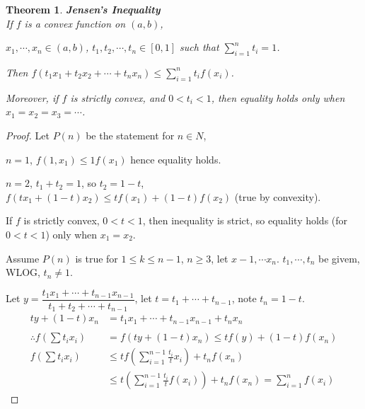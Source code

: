 \documentclass[12pt]{article}
\theoremstyle{plain}
\newtheorem{theorem}{Theorem}[subsection]
\begin{document}
    \begin{theorem}{\textbf{Jensen's Inequality}}\\
			If $f$ is a convex function on $(a,b)$, 
			
			$x_1, \cdots, x_n \in (a,b)$,
			$t_1, t_2, \cdots, t_n \in [0, 1]$ such that $\sum^n_{i=1} t_i = 1$. 

			Then $f(t_1x_1+t_2x_2+\cdots+t_nx_n) \leq \sum^n_{i=1}t_if(x_i)$. 

			Moreover, if $f$ is strictly convex, and $0<t_i<1$, 
			then equality holds only when $x_1 = x_2 = x_3 = \cdots$. 
    \end{theorem} 
    \begin{proof}
    	Let $P(n)$ be the statement for $n\in N$,

    	$n=1$, $f(1, x_1) \leq 1f(x_1)$ hence equality holds. 

    	$n = 2$, $t_1+t_2 = 1$, so $t_2 = 1-t$, 
    	$f(t x_1+(1-t)x_2)\leq tf(x_1)+(1-t)f(x_2)$ (true by convexity). 

    	If $f$ is strictly convex, $0 < t < 1$, then inequality is strict,
    	so equality holds (for $0 < t < 1$) only when $x_1 = x_2$. 

    	Assume $P(n)$ is true for $1\leq k\leq n-1$, $n\geq 3$, 
    	let $x-1, \cdots x_n$. $t_1,\cdots, t_n$ be givem, WLOG, 
    	$t_n\neq 1$. 

    	Let $y = \dfrac{t_1x_1+\cdots+t_{n-1}x_{n-1}}{t_1+t_2+\cdots+t_{n-1}}$,
    	let $t = t_1+\cdots + t_{n-1}$, note $t_n = 1-t$. 
			\begin{align*}
				ty + (1-t) x_n &= t_1x_1+\cdots+t_{n-1}x_{n-1}+t_nx_n\\\\
				\therefore f(\sum t_ix_i)
											 &=f(ty+(1-t)x_n)\leq tf(y)+(1-t)f(x_n)\\
				f(\sum t_ix_i)
				&\leq tf(\sum^{n-1}_{i=1} \frac{t_i}t x_i)+t_n f(x_n)\\
				&\leq t(\sum_{i=1}^{n-1} \frac{t_i}{t}f(x_i))+t_nf(x_n)
				=\sum_{i=1}^n f(x_i)
			\end{align*}
    \end{proof}
\end{document}
